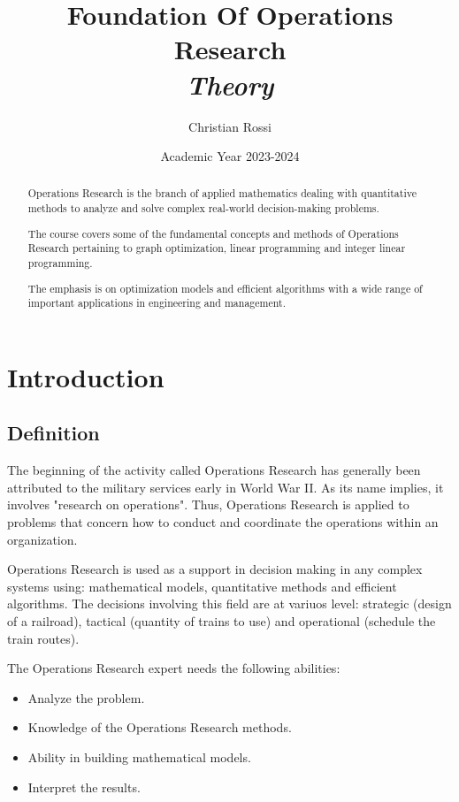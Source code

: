 \documentclass[12pt, a4paper]{report}
\title{Foundation Of Operations Research \\ \textit{Theory}}
\author{Christian Rossi}
\date{Academic Year 2023-2024}
\theoremstyle{remark}
\begin{document}
\maketitle

\newpage

\begin{abstract}
    Operations Research is the branch of applied mathematics dealing with quantitative methods to analyze and solve
    complex real-world decision-making problems. 
    
    The course covers some of the fundamental concepts and methods of Operations Research pertaining to graph optimization, 
    linear programming and integer linear programming. 
    
    The emphasis is on optimization models and efficient algorithms with a wide range of important applications in 
    engineering and management.  
\end{abstract}

\newpage

\tableofcontents

\newpage

\chapter{Introduction}
\section{Definition}
The beginning of the activity called Operations Research has generally been attributed to the military services early in 
World War II. As its name implies, it involves "research on operations". Thus, Operations Research is applied to problems that
concern how to conduct and coordinate the operations within an organization. 

Operations Research is used as a support in decision making in any complex systems using: mathematical models, quantitative methods
and efficient algorithms. The decisions involving this field are at variuos level: strategic (design of a railroad),
tactical (quantity of trains to use) and operational (schedule the train routes).

The Operations Research expert needs the following abilities: 
\begin{itemize}
    \item Analyze the problem.
    \item Knowledge of the Operations Research methods.
    \item Ability in building mathematical models. 
    \item Interpret the results.
\end{itemize}
\end{document}
